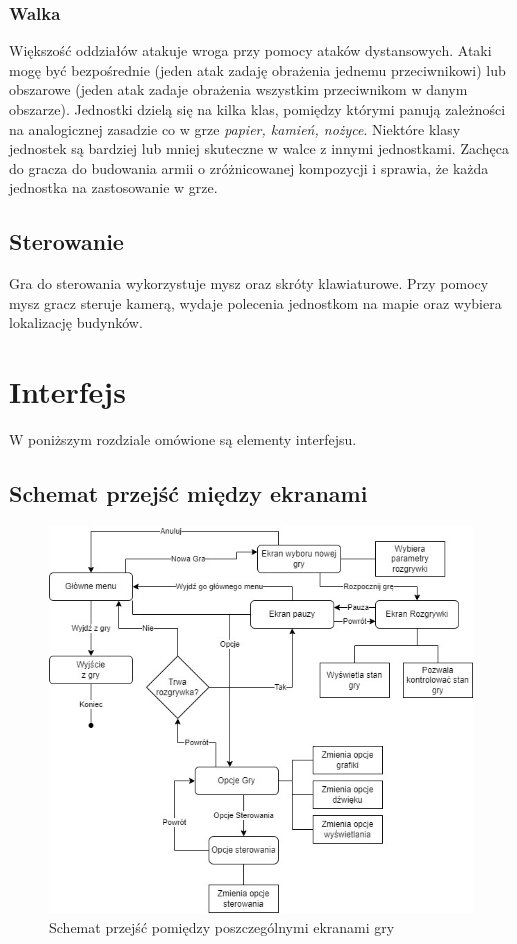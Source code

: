 \documentclass[a4paper]{scrreprt}
\begin{document}
\subsection{Walka}
Większość oddziałów atakuje wroga przy pomocy ataków dystansowych. Ataki mogę być bezpośrednie (jeden atak zadaję obrażenia jednemu przeciwnikowi) lub obszarowe (jeden atak zadaje obrażenia wszystkim przeciwnikom w danym obszarze). Jednostki dzielą się na kilka klas, pomiędzy którymi panują zależności na analogicznej zasadzie co w grze \emph{papier, kamień, nożyce}. Niektóre klasy jednostek są bardziej lub mniej skuteczne w walce z innymi jednostkami. Zachęca do gracza do budowania armii o zróżnicowanej kompozycji i sprawia, że każda jednostka na zastosowanie w grze.
\section{Sterowanie}
Gra do sterowania wykorzystuje mysz oraz skróty klawiaturowe. Przy pomocy mysz gracz steruje kamerą, wydaje polecenia jednostkom na mapie oraz wybiera lokalizację budynków.


\chapter{Interfejs}
W poniższym rozdziale omówione są elementy interfejsu. 
\section{Schemat przejść między ekranami}

\begin{figure}[hb]
  \centering
  \includegraphics[width=1\textwidth]{screenDiagram.jpg}
  \caption{\label{fig:schema1} Schemat przejść pomiędzy poszczególnymi ekranami gry}
\end{figure}
\newpage
\end{document}
